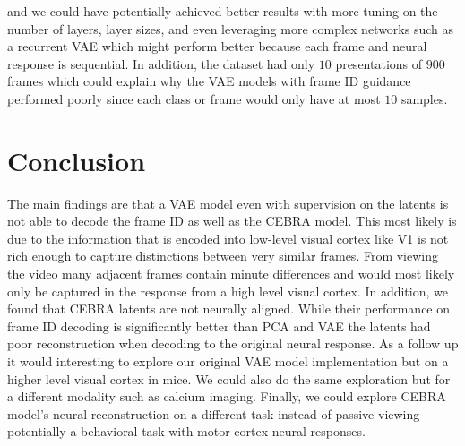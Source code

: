 \documentclass[12pt, letterpaper]{article}
\begin{document}
and we could have potentially achieved better results with more tuning on the number of layers, layer sizes, and even leveraging more complex networks such as a recurrent VAE which might perform better because each frame and neural response is sequential. In addition, the dataset had only $10$ presentations of $900$ frames which could explain why the VAE models with frame ID guidance performed poorly since each class or frame would only have at most $10$ samples. 

\section{Conclusion}
\label{sec:conclusion}
The main findings are that a VAE model even with supervision on the latents is not able to decode the frame ID as well as the CEBRA \cite{schneider2023} model. This most likely is due to the information that is encoded into low-level visual cortex like V1 is not rich enough to capture distinctions between very similar frames. From viewing the video many adjacent frames contain minute differences and would most likely only be captured in the response from a high level visual cortex. In addition, we found that CEBRA \cite{schneider2023} latents are not neurally aligned. While their performance on frame ID decoding is significantly better than PCA and VAE the latents had poor reconstruction when decoding to the original neural response. As a follow up it would interesting to explore our original VAE model implementation but on a higher level visual cortex in mice. We could also do the same exploration but for a different modality such as calcium imaging. Finally, we could explore CEBRA \cite{schneider2023} model's neural reconstruction on a different task instead of passive viewing potentially a behavioral task with motor cortex neural responses. 
\end{document}
